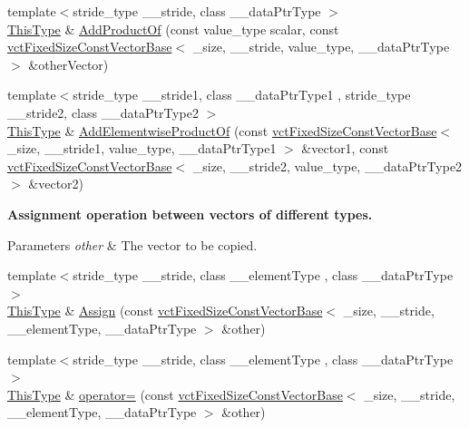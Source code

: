 \begin{DoxyCompactItemize}
\item 
{\footnotesize template$<$stride\-\_\-type \-\_\-\-\_\-stride, class \-\_\-\-\_\-data\-Ptr\-Type $>$ }\\\hyperlink{classvct_fixed_size_const_vector_base_a071063bc4fa43112cc287b2dbef53180}{This\-Type} \& \hyperlink{classvct_fixed_size_vector_base_a850445a0bda31f286347257e54b721a3}{Add\-Product\-Of} (const value\-\_\-type scalar, const \hyperlink{classvct_fixed_size_const_vector_base}{vct\-Fixed\-Size\-Const\-Vector\-Base}$<$ \-\_\-size, \-\_\-\-\_\-stride, value\-\_\-type, \-\_\-\-\_\-data\-Ptr\-Type $>$ \&other\-Vector)
\item 
{\footnotesize template$<$stride\-\_\-type \-\_\-\-\_\-stride1, class \-\_\-\-\_\-data\-Ptr\-Type1 , stride\-\_\-type \-\_\-\-\_\-stride2, class \-\_\-\-\_\-data\-Ptr\-Type2 $>$ }\\\hyperlink{classvct_fixed_size_const_vector_base_a071063bc4fa43112cc287b2dbef53180}{This\-Type} \& \hyperlink{classvct_fixed_size_vector_base_a3bf0e468dd8a468889edd1c13a3d3f15}{Add\-Elementwise\-Product\-Of} (const \hyperlink{classvct_fixed_size_const_vector_base}{vct\-Fixed\-Size\-Const\-Vector\-Base}$<$ \-\_\-size, \-\_\-\-\_\-stride1, value\-\_\-type, \-\_\-\-\_\-data\-Ptr\-Type1 $>$ \&vector1, const \hyperlink{classvct_fixed_size_const_vector_base}{vct\-Fixed\-Size\-Const\-Vector\-Base}$<$ \-\_\-size, \-\_\-\-\_\-stride2, value\-\_\-type, \-\_\-\-\_\-data\-Ptr\-Type2 $>$ \&vector2)
\end{DoxyCompactItemize}
\begin{Indent}{\bf Assignment operation between vectors of different types.}\par
{\em 
\begin{DoxyParams}{Parameters}
{\em other} & The vector to be copied. \\
\hline
\end{DoxyParams}
}\begin{DoxyCompactItemize}
\item 
{\footnotesize template$<$stride\-\_\-type \-\_\-\-\_\-stride, class \-\_\-\-\_\-element\-Type , class \-\_\-\-\_\-data\-Ptr\-Type $>$ }\\\hyperlink{classvct_fixed_size_const_vector_base_a071063bc4fa43112cc287b2dbef53180}{This\-Type} \& \hyperlink{classvct_fixed_size_vector_base_a0bfbc67194bcb1aa6b614524df8d1fa1}{Assign} (const \hyperlink{classvct_fixed_size_const_vector_base}{vct\-Fixed\-Size\-Const\-Vector\-Base}$<$ \-\_\-size, \-\_\-\-\_\-stride, \-\_\-\-\_\-element\-Type, \-\_\-\-\_\-data\-Ptr\-Type $>$ \&other)
\item 
{\footnotesize template$<$stride\-\_\-type \-\_\-\-\_\-stride, class \-\_\-\-\_\-element\-Type , class \-\_\-\-\_\-data\-Ptr\-Type $>$ }\\\hyperlink{classvct_fixed_size_const_vector_base_a071063bc4fa43112cc287b2dbef53180}{This\-Type} \& \hyperlink{classvct_fixed_size_vector_base_aedf9b574d02b606439207e358a4d6013}{operator=} (const \hyperlink{classvct_fixed_size_const_vector_base}{vct\-Fixed\-Size\-Const\-Vector\-Base}$<$ \-\_\-size, \-\_\-\-\_\-stride, \-\_\-\-\_\-element\-Type, \-\_\-\-\_\-data\-Ptr\-Type $>$ \&other)
\end{DoxyCompactItemize}
\end{Indent}
